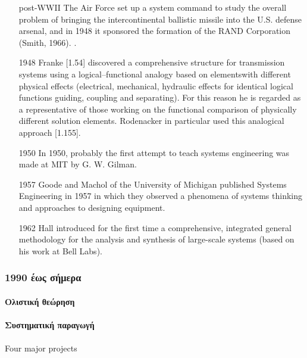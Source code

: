 \documentclass[a4paper,12pt,twoside]{report}
\begin{document}
{\begin{itemize}
approach” began to be more commonly used.  \cite[page 15]{HowToDoSystemAnalysis:Gibson2007}.
				\item [post-WWII] The Air Force set up a system command to study the overall problem of bringing the intercontinental ballistic missile into the U.S. defense arsenal, and in 1948 it sponsored the formation of the RAND Corporation (Smith, 1966).  \cite[page 18]{HowToDoSystemAnalysis:Gibson2007}.
				\item [1948] Franke [1.54] discovered a comprehensive structure for transmission systems using a logical–functional analogy based on elementswith different physical effects (electrical, mechanical, hydraulic effects for identical logical functions guiding, coupling and separating). For this reason he is regarded as a representative of those working on the functional comparison of physically different solution elements. Rodenacker in particular used this analogical approach [1.155]. \cite[σελ. 12]{EngineeringDesignASystematicApproach:Pahl1996}
				\item [1950] In 1950, probably the first attempt to teach systems engineering was made at MIT by G. W. Gilman.
				\item [1957] Goode and Machol of the University of Michigan published Systems Engineering in 1957 in which they observed a phenomena of systems thinking and approaches to designing equipment.
				\item [1962] Hall introduced for the first time a comprehensive, integrated general methodology for the analysis and synthesis of large-scale systems (based on his work at Bell Labs). 
			\end{itemize}

		\subsubsection{1990 έως σήμερα}
		
			\paragraph{Ολιστική θεώρηση}{
			}
			\paragraph{Συστηματική παραγωγή}{
			}

			
			
			
			\paragraph{}{Four major projects \cite{RescuingPrometheus}
			}




}
\end{document}
